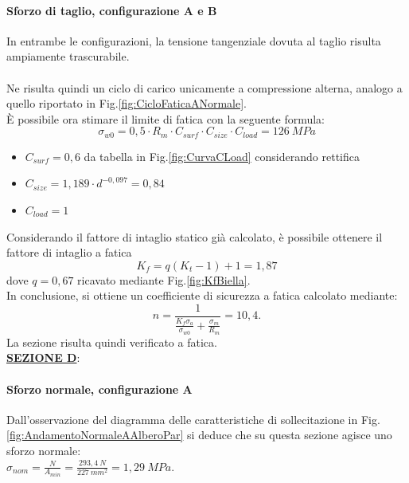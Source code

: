 \paragraph{Sforzo di taglio, configurazione A e B} In entrambe le configurazioni, la tensione tangenziale dovuta al taglio risulta ampiamente trascurabile.\\
\\
Ne risulta quindi un ciclo di carico unicamente a compressione alterna, analogo a quello riportato in Fig.\ref{fig:CicloFaticaANormale}.\\
È possibile ora stimare il limite di fatica con la seguente formula:
\begin{equation}
    \sigma_{w0}=0,5\cdot R_m\cdot C_{surf}\cdot C_{size}\cdot C_{load}=126\ MPa
\end{equation}
\begin{itemize}
    \item $C_{surf}=0,6$ da tabella in Fig.\ref{fig:CurvaCLoad} considerando rettifica 
    \item $C_{size}=1,189\cdot d^{-0,097}=0,84$
    \item $C_{load}=1$
\end{itemize}
Considerando il fattore di intaglio statico già calcolato, è possibile ottenere il fattore di intaglio a fatica
\begin{equation}
    K_f=q\left(K_t-1\right)+1=1,87
\end{equation}
dove $q=0,67$ ricavato mediante Fig.\ref{fig:KfBiella}.\\
In conclusione, si ottiene un coefficiente di sicurezza a fatica calcolato mediante:
\begin{equation}
    n=\frac{1}{\frac{K_f\sigma_a}{\sigma_{w0}}+\frac{\sigma_m}{R_m}}=10,4.
\end{equation}
La sezione risulta quindi verificato a fatica. \\
\newpage
\underline{\textbf{SEZIONE D}}:
\paragraph{Sforzo normale, configurazione A} Dall'osservazione del diagramma delle caratteristiche di sollecitazione in Fig.\ref{fig:AndamentoNormaleAAlberoPar} si deduce che su questa sezione agisce uno sforzo normale:\\
$\sigma_{nom}=\frac{N}{A_{min}}=\frac{293,4\ N}{227\ mm^2}=1,29\ MPa$.
